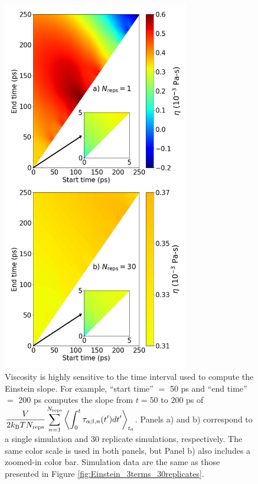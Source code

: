 \documentclass[9pt,bestpractices]{livecoms}
\begin{document}
\begin{figure}[htb!]
	\centering
	\includegraphics[width=3.2in]{Einstein_slope_time_interval.png}
	\caption{Viscosity is highly sensitive to the time interval used to compute the Einstein slope. For example, ``start time'' $=$ 50 ps and ``end time'' $=$ 200 ps computes the slope from $t = 50$ to $200$ ps of $\displaystyle \frac{V}{2 k_{\rm B} T N_{\rm reps}} \sum_{n=1}^{N_{\rm reps}} \left\langle \int_0^t \tau_{\alpha\beta,n}(t') dt' \right\rangle_{t_0}$. Panels a) and b) correspond to a single simulation and 30 replicate simulations, respectively. The same color scale is used in both panels, but Panel b) also includes a zoomed-in color bar. Simulation data are the same as those presented in Figure \ref{fig:Einstein_3terms_30replicates}.}
	\label{fig:Einstein_slope_time_interval}
\end{figure}

\end{document}
